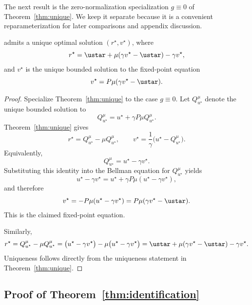 The next result is the zero-normalization specialization \(g\equiv 0\) of
Theorem~\ref{thm:unique}. We keep it separate because it is a convenient
reparameterization for later comparisons and appendix discussion.

\begin{theorem}
\label{thm:unique2}
 admits a unique optimal solution \((r^\star,v^\star)\), where
\[
r^\star = \ustar + \mu(\gamma v^\star - \ustar) - \gamma v^\star,
\]
and \(v^\star\) is the unique bounded solution to the fixed-point equation
\[
v^\star = P\mu(\gamma v^\star - \ustar).
\]
\end{theorem}

\begin{proof}
Specialize Theorem~\ref{thm:unique} to the case \(g\equiv 0\). Let
\(Q^\mu_{u^\star}\) denote the unique bounded solution to
\[
Q^\mu_{u^\star}
=
u^\star+\gamma P\mu Q^\mu_{u^\star}.
\]
Theorem~\ref{thm:unique} gives
\[
r^\star
=
Q^\mu_{u^\star}-\mu Q^\mu_{u^\star},
\qquad
v^\star
=
\frac{1}{\gamma}\bigl(u^\star-Q^\mu_{u^\star}\bigr).
\]
Equivalently,
\[
Q^\mu_{u^\star}=u^\star-\gamma v^\star.
\]
Substituting this identity into the Bellman equation for \(Q^\mu_{u^\star}\)
yields
\[
u^\star-\gamma v^\star
=
u^\star+\gamma P\mu(u^\star-\gamma v^\star),
\]
and therefore
\[
v^\star
=
-P\mu(u^\star-\gamma v^\star)
=
P\mu(\gamma v^\star-\ustar).
\]
This is the claimed fixed-point equation.

Similarly,
\[
r^\star
=
Q^\mu_{u^\star}-\mu Q^\mu_{u^\star}
=
\bigl(u^\star-\gamma v^\star\bigr)-\mu\bigl(u^\star-\gamma v^\star\bigr)
=
\ustar + \mu(\gamma v^\star-\ustar)-\gamma v^\star.
\]
Uniqueness follows directly from the uniqueness statement in
Theorem~\ref{thm:unique}.
\end{proof}

\subsection{Proof of Theorem~\ref{thm:identification}}

